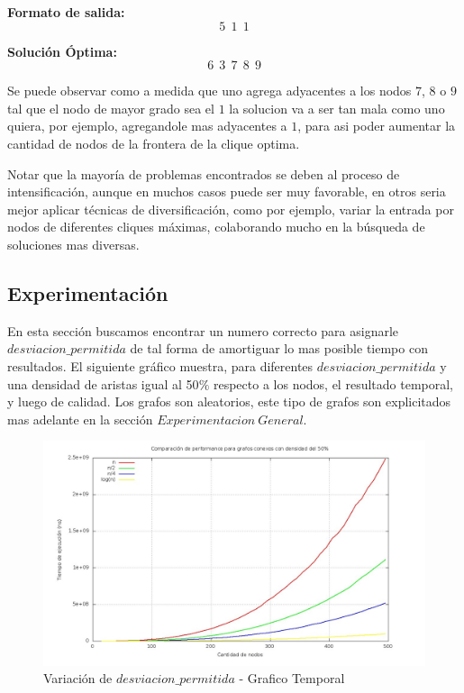 \textbf{Formato de salida:}
$$5\ \   1\ \   1$$

\textbf{Solución Óptima:}
 $$6\ \   3\ \   7\ \   8\ \   9$$\newline

Se puede observar como a medida que uno agrega adyacentes a los nodos $7$, $8$ o $9$ tal que el nodo de mayor grado sea el $1$ la solucion va a ser tan mala como uno quiera, por ejemplo, agregandole mas adyacentes a $1$, para asi poder aumentar la cantidad de nodos de la frontera de la clique optima. \newline

Notar que la mayoría de problemas encontrados se deben al proceso de intensificación, aunque en muchos casos puede ser muy favorable, en otros seria mejor aplicar técnicas de diversificación, como por ejemplo, variar la entrada por nodos de diferentes cliques máximas, colaborando mucho en la búsqueda de soluciones mas diversas.

\subsection{Experimentación}

 En esta sección buscamos encontrar un numero correcto para asignarle $desviacion\_permitida$ de tal forma de amortiguar lo mas posible tiempo con resultados. \newline
 El siguiente gráfico muestra, para diferentes $desviacion\_permitida$ y una densidad de aristas igual al 50$\%$ respecto a los nodos, el resultado temporal, y luego de calidad. Los grafos son aleatorios, este tipo de grafos son explicitados mas adelante en la sección $Experimentacion\ General$.


\begin{figure}[H] %
\begin{center}
\includegraphics[width=400pt]{../imgs/variaciontemporal_tabu.jpg}
\caption{Variación de $desviacion\_permitida$ - Grafico Temporal}
\end{center}
\end{figure}

